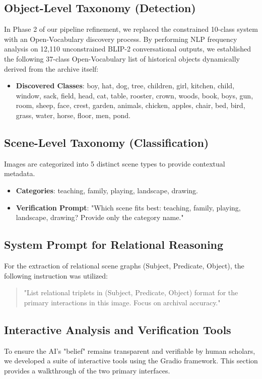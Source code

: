 \documentclass[12pt,onecolumn,a4paper]{IEEEtran}
\begin{document}
\subsection{Object-Level Taxonomy (Detection)}
In Phase 2 of our pipeline refinement, we replaced the constrained 10-class system with an Open-Vocabulary discovery process. By performing NLP frequency analysis on 12,110 unconstrained BLIP-2 conversational outputs, we established the following 37-class Open-Vocabulary list of historical objects dynamically derived from the archive itself:
\begin{itemize}
    \item \textbf{Discovered Classes}: boy, hat, dog, tree, children, girl, kitchen, child, window, sack, field, head, cat, table, rooster, crown, woods, book, boys, gun, room, sheep, face, crest, garden, animals, chicken, apples, chair, bed, bird, grass, water, horse, floor, men, pond.
\end{itemize}

\subsection{Scene-Level Taxonomy (Classification)}
Images are categorized into 5 distinct scene types to provide contextual metadata.
\begin{itemize}
    \item \textbf{Categories}: teaching, family, playing, landscape, drawing.
    \item \textbf{Verification Prompt}: "Which scene fits best: teaching, family, playing, landscape, drawing? Provide only the category name."
\end{itemize}

\subsection{System Prompt for Relational Reasoning}
For the extraction of relational scene graphs (Subject, Predicate, Object), the following instruction was utilized:
\begin{quote}
    "List relational triplets in (Subject, Predicate, Object) format for the primary interactions in this image. Focus on archival accuracy."
\end{quote}

\subsection{Interactive Analysis and Verification Tools}
To ensure the AI's "belief" remains transparent and verifiable by human scholars, we developed a suite of interactive tools using the Gradio framework. This section provides a walkthrough of the two primary interfaces.
\end{document}
